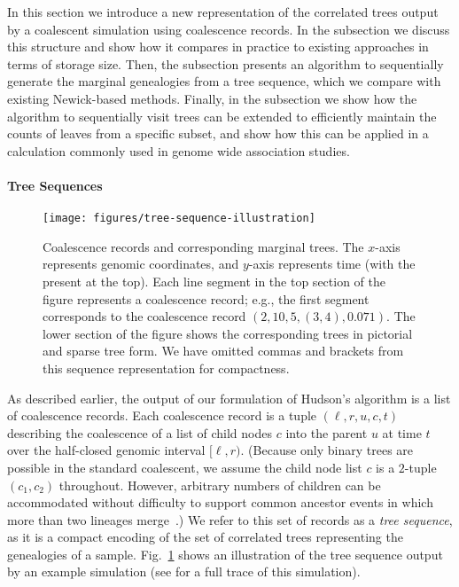 \documentclass[10pt,letterpaper]{article}
\begin{document}
In this section we introduce a new representation of the correlated trees
output by a coalescent simulation using coalescence records. In
the \textbf{} subsection we discuss this structure and
show how it compares in practice to existing approaches in terms of storage
size. Then, the \textbf{} subsection
presents an algorithm to sequentially
generate the marginal genealogies from a tree sequence, which we compare with
existing Newick-based methods. Finally, in the \textbf{}
subsection we
show how the algorithm to sequentially visit trees can be extended to
efficiently maintain the counts of leaves from a specific subset, and show how
this can be applied in a calculation commonly used in genome wide association
studies.

\paragraph*{Tree Sequences}
\label{sec-tree-sequences}

\begin{figure}
    \begin{center}
        \texttt{[image: figures/tree-sequence-illustration]}
    \end{center}
    \caption{\label{fig-tree-sequence-illustration} Coalescence records
    and corresponding marginal trees. The $x$-axis represents genomic coordinates,
    and $y$-axis represents time (with the present at the top).
    Each line segment in the top section of the figure represents
    a coalescence record; e.g., the first segment corresponds to the
    coalescence record $(2, 10, 5, (3, 4), 0.071)$.
    The lower section of the figure shows the
    corresponding trees in pictorial and sparse tree
    form. We have omitted commas and brackets from this sequence
    representation for compactness.
}
\end{figure}

As described earlier, the output of our formulation of Hudson's algorithm
is a list of coalescence records.
Each coalescence record is a tuple $(\ell, r, u, c, t)$
describing the coalescence of a list of child nodes $c$ into the parent $u$ at
time $t$ over the half-closed genomic interval $[\ell, r)$. (Because only
binary trees are possible in the standard coalescent, we assume the child node
list $c$ is a $2$-tuple $(c_1, c_2)$ throughout. However, arbitrary numbers of
children can be accommodated without difficulty to support
common ancestor events in which more than two lineages
merge~\citep{gdb00,dk99,p99,s99}.)
We refer to this set of records as a
\emph{tree sequence}, as it is a compact encoding of the set of correlated
trees representing the genealogies of a sample.
Fig.~\ref{fig-tree-sequence-illustration} shows an illustration of
the tree sequence output by an example simulation (see
 for a full trace of this simulation).
\end{document}
